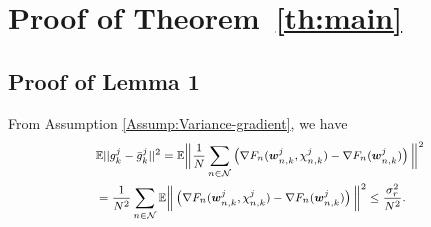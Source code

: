 
\appendix \label{appendix_lemmas}

\section{Proof of Theorem~\eqref{th:main}}\label{app:th}
\label{subsection:Appen}
\subsection{Proof of Lemma 1}
\vspace{-5pt}
\label{Lemma_SGD:upperbound}
From Assumption \eqref{Assump:Variance-gradient}, we have
\begin{equation} 
\footnotesize
\begin{aligned}
& \mathbb{E} ||g_k^j- \bar{g}_k^j||^2 = \mathbb{E} \Big\Vert \frac{1}{N} \sum_{n\in\mathcal{N}} \left(\nabla F_{n}(\boldsymbol{w}_{n,k}^j,\chi_{n,k}^j) - \nabla F_{n}(\boldsymbol{w}_{n,k}^j) \right)\Big\Vert^2 
\\&=\frac{1}{N^2}   \sum_{n\in\mathcal{N}} \mathbb{E} \Big\Vert\left(\nabla F_{n}(\boldsymbol{w}_{n,k}^j,\chi_{n,k}^j) - \nabla F_{n}(\boldsymbol{w}_{n,k}^j) \right)\Big\Vert^2
\leq \frac{\sigma_r^2}{N^2}.
\end{aligned}
\end{equation}
\vspace{-5pt} 
